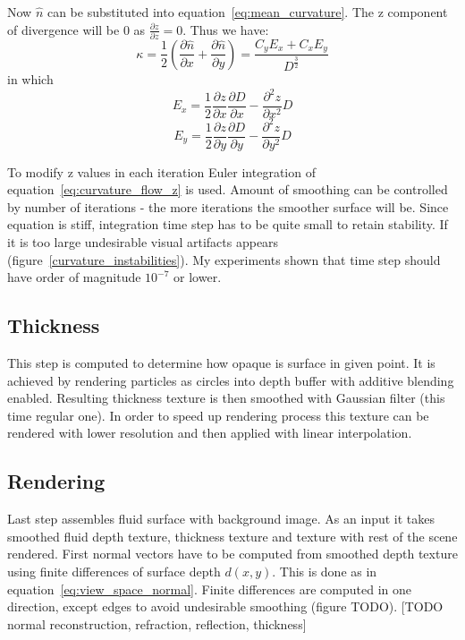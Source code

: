Now $\hat{n}$ can be substituted into equation~\ref{eq:mean_curvature}. The z component of divergence will be 0 as $\frac{\partial z}{\partial z} = 0$. Thus we have:
\begin{equation}
\kappa = \frac{1}{2} \left( \frac{\partial \hat{n}}{\partial x} + \frac{\partial \hat{n}}{\partial y} \right) = \frac{C_y E_x + C_x E_y}{D^{\frac{3}{2}}}
\end{equation}
in which 
\begin{equation}
E_x = \frac{1}{2} \frac{\partial z}{\partial x} \frac{\partial D}{\partial x} - \frac{\partial^2 z}{\partial x^2}D
\end{equation}
\begin{equation}
E_y = \frac{1}{2} \frac{\partial z}{\partial y} \frac{\partial D}{\partial y} - \frac{\partial^2 z}{\partial y^2}D
\end{equation}

To modify z values in each iteration Euler integration of equation~\ref{eq:curvature_flow_z} is used. Amount of smoothing can be controlled by number of iterations - the more iterations the smoother surface will be. Since equation is stiff, integration time step has to be quite small to retain stability. If it is too large undesirable visual artifacts appears (figure~\ref{curvature_instabilities}). My experiments shown that time step should have order of magnitude $10^{-7}$ or lower.

\subsection{Thickness} \label{sec:thickness}
This step is computed to determine how opaque is surface in given point. It is achieved by rendering particles as circles into depth buffer with additive blending enabled. Resulting thickness texture is then smoothed with Gaussian filter (this time regular one). In order to speed up rendering process this texture can be rendered with lower resolution and then applied with linear interpolation. 

\subsection{Rendering} \label{sec:rendering}
Last step assembles fluid surface with background image. As an input it takes smoothed fluid depth texture, thickness texture and texture with rest of the scene rendered. 
First normal vectors have to be computed from smoothed depth texture using finite differences of surface depth $d(x, y)$. This is done as in equation~\ref{eq:view_space_normal}. Finite differences are computed in one direction, except edges to avoid undesirable smoothing (figure TODO). 
[TODO normal reconstruction, refraction, reflection, thickness]

